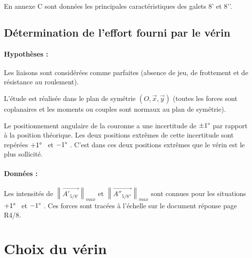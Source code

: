 ~\

En annexe C sont données les principales caractéristiques des galets 8’ et 8’’.


\subsection{Détermination de l’effort fourni par le vérin}

\paragraph{Hypothèses :}

Les liaisons sont considérées comme parfaites (absence de jeu, de frottement et de résistance au roulement).

L’étude est réalisée dans le plan de symétrie $(O,\vec{x},\vec{y})$ (toutes les forces sont coplanaires et les moments ou couples sont normaux au plan de symétrie).

Le positionnement angulaire de la couronne a une incertitude de $\pm 1\degree$ par rapport à la position théorique. Les deux positions extrêmes de cette incertitude sont repérées \og $+1\degree$ \fg\ et \og $-1\degree$ \fg. C’est dans ces deux positions extrêmes que le vérin est le plus sollicité.

\paragraph{Données :}

Les intensités de $\left\|\overrightarrow{A'_{5/8'}}\right\|_{max}$ et $\left\|\overrightarrow{A''_{5/8''}}\right\|_{max}$ sont connues pour les situations \og $+1\degree$ \fg\ et \og $-1\degree$ \fg. Ces forces sont tracées à l’échelle sur le document réponse page R4/8.




\section{Choix du vérin}

